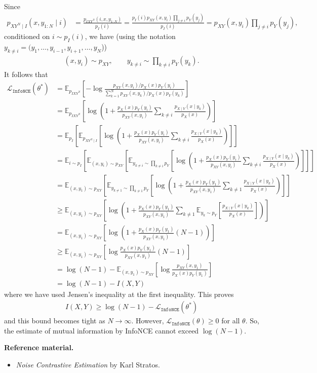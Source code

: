 \documentclass[11pt]{article}
\newcommand{\EE}{\mathbb{E}}
\newcommand{\LL}{\mathcal{L}}
\newcommand{\infonce}{\texttt{InfoNCE}}
\begin{document}
Since
\begin{align*}
p_{XY^N \mid I}(x,y_{1:N} \mid i) &= \frac{p_{IXY^N}(i,x,y_{1:N})}{p_{I}(i)} = \frac{p_I(i) p_{XY}(x,y_i) \prod_{j \neq i} p_Y(y_j)}{p_{I}(i)} = p_{XY}(x,y_i) \prod_{j \neq i} p_Y(y_j),
\end{align*}
conditioned on $i \sim p_I(i)$, we have (using the notation $y_{k \neq i} = (y_1, \ldots, y_{i - 1}, y_{i + 1}, \ldots, y_N$))
\begin{align*}
(x,y_i) \sim p_{XY}, \qquad y_{k \neq i} \sim \prod_{k \neq i} p_Y(y_k).
\end{align*}
It follows that
\begin{align*}
\LL_\infonce(\theta^*) &= \EE_{p_{IXY^N}} \left[ - \log \frac{p_{XY}(x,y_i) / p_X(x)p_Y(y_i)}{\sum_{k = 1}^N p_{XY}(x,y_k) / p_X(x)p_Y(y_k)} \right] \\
&= \EE_{p_{IXY^N}} \left[ \log \left( 1 + \frac{p_X(x)p_Y(y_i)}{p_{XY}(x,y_i)} \sum_{k \neq i} \frac{p_{X \mid Y}(x \mid y_k)}{p_X(x)} \right) \right] \\
&= \EE_{p_I} \left[ \EE_{p_{XY^N \mid I}} \left[ \log \left( 1 + \frac{p_X(x)p_Y(y_i)}{p_{XY}(x,y_i)} \sum_{k \neq i} \frac{p_{X \mid Y}(x \mid y_k)}{p_X(x)} \right) \right] \right] \\
&= \EE_{i \sim p_I} \left[ \EE_{(x,y_i) \sim p_{XY}} \left[ \EE_{y_{k \neq i} \sim \prod_{k \neq i} p_Y} \left[ \log \left( 1 + \frac{p_X(x)p_Y(y_i)}{p_{XY}(x,y_i)} \sum_{k \neq i} \frac{p_{X \mid Y}(x \mid y_k)}{p_X(x)} \right) \right] \right] \right] \\
&= \EE_{(x,y_1) \sim p_{XY}} \left[ \EE_{y_{k \neq 1} \sim \prod_{k \neq 1} p_Y} \left[ \log \left( 1 + \frac{p_X(x)p_Y(y_1)}{p_{XY}(x,y_1)} \sum_{k \neq 1} \frac{p_{X \mid Y}(x \mid y_k)}{p_X(x)} \right) \right] \right] \\
&\geq \EE_{(x,y_1) \sim p_{XY}} \left[ \log\left( 1 + \frac{p_X(x)p_Y(y_1)}{p_{XY}(x,y_1)} \sum_{k \neq 1} \EE_{y_k \sim p_Y} \left[ \frac{p_{X \mid Y}(x \mid y_k)}{p_X(x)} \right] \right) \right] \\
&= \EE_{(x,y_1) \sim p_{XY}} \left[ \log\left( 1 + \frac{p_X(x)p_Y(y_1)}{p_{XY}(x,y_1)} (N - 1) \right) \right] \\
&\geq \EE_{(x,y_1) \sim p_{XY}} \left[ \log \frac{p_X(x)p_Y(y_1)}{p_{XY}(x,y_1)} (N - 1) \right] \\
&= \log(N - 1) - \EE_{(x,y_1) \sim p_{XY}} \left[ \log \frac{p_{XY}(x,y_1)}{p_X(x)p_Y(y_1)} \right] \\
&= \log(N - 1) - I(X,Y)
\end{align*}
where we have used Jensen's inequality at the first inequality. This proves
\begin{align*}
I(X,Y) \geq \log(N - 1) - \LL_\infonce(\theta^*)
\end{align*}
and this bound becomes tight as $N \rightarrow \infty$. However, $\LL_\infonce(\theta) \geq 0$ for all $\theta$. So, the estimate of mutual information by InfoNCE cannot exceed $\log(N - 1)$.

\textbf{Reference material.}
\begin{itemize}
\item \textit{Noise Contrastive Estimation} by Karl Stratos.
\end{itemize}
\end{document}
